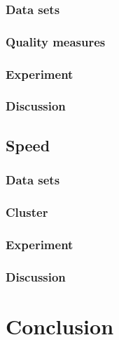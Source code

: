\documentclass{article}
\begin{document}
\subsubsection{Data sets}

\subsubsection{Quality measures}

\subsubsection{Experiment}

\subsubsection{Discussion}

\subsection{Speed}

\subsubsection{Data sets}

\subsubsection{Cluster}

\subsubsection{Experiment}

\subsubsection{Discussion}


\section{Conclusion}
\end{document}
